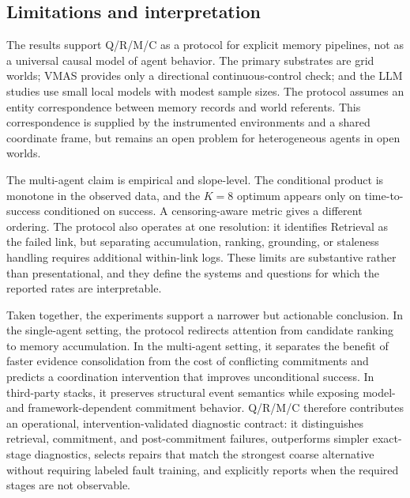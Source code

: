 \documentclass[letterpaper]{article} %
\begin{document}
\subsection{Limitations and interpretation}

The results support Q/R/M/C as a protocol for explicit memory pipelines, not as a universal causal model of agent behavior. The primary substrates are grid worlds; VMAS provides only a directional continuous-control check; and the LLM studies use small local models with modest sample sizes. The protocol assumes an entity correspondence between memory records and world referents. This correspondence is supplied by the instrumented environments and a shared coordinate frame, but remains an open problem for heterogeneous agents in open worlds.

The multi-agent claim is empirical and slope-level. The conditional product is monotone in the observed data, and the $K=8$ optimum appears only on time-to-success conditioned on success. A censoring-aware metric gives a different ordering. The protocol also operates at one resolution: it identifies Retrieval as the failed link, but separating accumulation, ranking, grounding, or staleness handling requires additional within-link logs. These limits are substantive rather than presentational, and they define the systems and questions for which the reported rates are interpretable.

Taken together, the experiments support a narrower but actionable conclusion. In the single-agent setting, the protocol redirects attention from candidate ranking to memory accumulation. In the multi-agent setting, it separates the benefit of faster evidence consolidation from the cost of conflicting commitments and predicts a coordination intervention that improves unconditional success. In third-party stacks, it preserves structural event semantics while exposing model- and framework-dependent commitment behavior. Q/R/M/C therefore contributes an operational, intervention-validated diagnostic contract: it distinguishes retrieval, commitment, and post-commitment failures, outperforms simpler exact-stage diagnostics, selects repairs that match the strongest coarse alternative without requiring labeled fault training, and explicitly reports when the required stages are not observable.



\def\isChecklistMainFile{}

\end{document}
